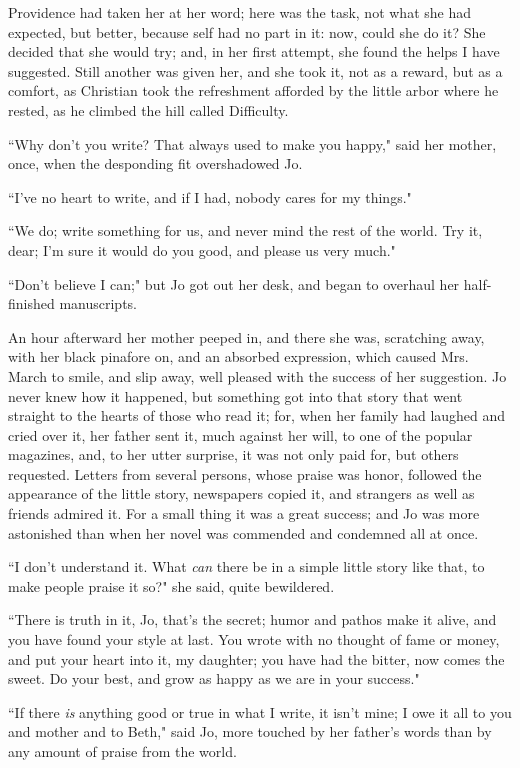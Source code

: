Providence had taken her at her word; here was the task, not what she
had expected, but better, because self had no part in it: now, could she
do it? She decided that she would try; and, in her first attempt, she
found the helps I have suggested. Still another was given her, and she
took it, not as a reward, but as a comfort, as Christian took the
refreshment afforded by the little arbor where he rested, as he climbed
the hill called Difficulty.

``Why don't you write? That always used to make you
happy," said her mother, once, when the desponding fit overshadowed Jo.

``I've no heart to write, and if I had, nobody cares for
my things."

``We do; write something for us, and never mind the rest of the world.
Try it, dear; I'm sure it would do you good, and please
us very much."

``Don't believe I can;" but Jo got out her desk, and
began to overhaul her half-finished manuscripts.

An hour afterward her mother peeped in, and there she was, scratching
away, with her black pinafore on, and an absorbed expression, which
caused Mrs. March to smile, and slip away, well pleased with the success
of her suggestion. Jo never knew how it happened, but something got into
that story that went straight to the hearts of those who read it; for,
when her family had laughed and cried over it, her father sent it, much
against her will, to one of the popular magazines, and, to her utter
surprise, it was not only paid for, but others requested. Letters from
several persons, whose praise was honor, followed the appearance of the
little story, newspapers copied it, and strangers as well as friends
admired it. For a small thing it was a great success; and Jo was more
astonished than when her novel was commended and condemned all at once.

``I don't understand it. What \emph{can} there be in a
simple little story like that, to make people praise it so?" she said,
quite bewildered.

``There is truth in it, Jo, that's the secret; humor and
pathos make it alive, and you have found your style at last. You wrote
with no thought of fame or money, and put your heart into it, my
daughter; you have had the bitter, now comes the sweet. Do your best,
and grow as happy as we are in your success."

``If there \emph{is} anything good or true in what I write, it
isn't mine; I owe it all to you and mother and to Beth,"
said Jo, more touched by her father's words than by any
amount of praise from the world.


